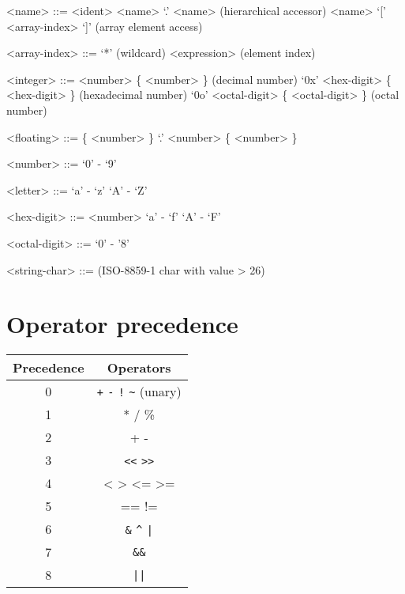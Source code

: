 \documentclass{article}
\begin{document}
\begin{grammar}
  <name> ::= <ident>
  \alt <name> `.' <name> (hierarchical accessor)
  \alt <name> `[' <array-index> `]' (array element access)

  <array-index> ::= `*' (wildcard)
  \alt <expression> (element index)

  <integer> ::= <number> \{ <number> \} (decimal number)
  \alt `0x' <hex-digit> \{ <hex-digit> \} (hexadecimal number)
  \alt `0o' <octal-digit> \{ <octal-digit> \} (octal number)

  <floating> ::= \{ <number> \} `.' <number> \{ <number> \}
  
  <number> ::= `0' - `9'

  <letter> ::= `a' - `z'
  \alt `A' - `Z'

  <hex-digit> ::= <number>
  \alt `a' - `f'
  \alt `A' - `F'

  <octal-digit> ::= `0' - '8'

  <string-char> ::= (ISO-8859-1 char with value > 26)

\end{grammar}

\section*{Operator precedence}
\begin{centering}
\begin{tabular}{cc}
  \toprule
  \textbf{Precedence} & \textbf{Operators}\\
  \midrule
  0 & \verb!+! \verb!-! \verb|!| \verb!~! (unary)\\
  1 & * / \% \\
  2 & + - \\
  3 & \verb!<<! \verb!>>! \\
  4 & < > <= >= \\
  5 & == != \\
  6 & \verb!&! \verb!^! \verb!|! \\
  7 & \verb!&&! \\
  8 & \verb!||! \\
  \bottomrule
\end{tabular}
\end{centering}
\end{document}
